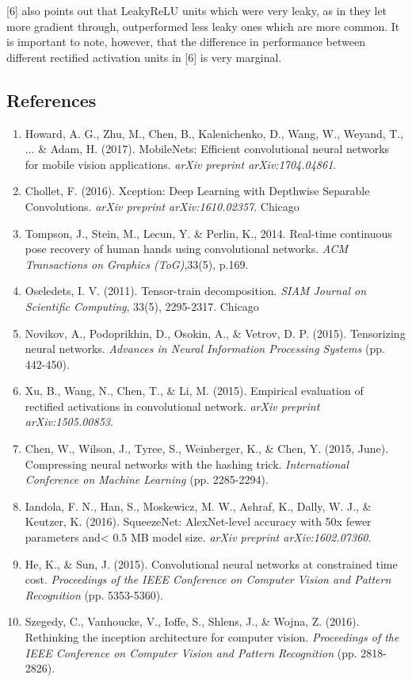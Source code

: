 \documentclass{article}
\begin{document}
[6] also points out that LeakyReLU units which were very leaky, as in they let more gradient through, outperformed less leaky ones which are more common. It is important to note, however, that the difference in performance between different rectified activation units in [6] is very marginal.

\subsection*{References}
\begin{enumerate}
\item Howard, A. G., Zhu, M., Chen, B., Kalenichenko, D., Wang, W., Weyand, T., ... \& Adam, H. (2017). MobileNets: Efficient convolutional neural networks for mobile vision applications. \emph{arXiv preprint arXiv:1704.04861}.
\item Chollet, F. (2016). Xception: Deep Learning with Depthwise Separable Convolutions. \emph{arXiv preprint arXiv:1610.02357}.
Chicago	
\item Tompson, J., Stein, M., Lecun, Y. \& Perlin, K., 2014. Real-time continuous pose recovery of human hands using convolutional networks. \emph{ACM Transactions on Graphics (ToG)},33(5), p.169.
\item Oseledets, I. V. (2011). Tensor-train decomposition. \emph{SIAM Journal on Scientific Computing}, 33(5), 2295-2317.
Chicago	
\item Novikov, A., Podoprikhin, D., Osokin, A., \& Vetrov, D. P. (2015). Tensorizing neural networks. \emph{Advances in Neural Information Processing Systems} (pp. 442-450).
\item Xu, B., Wang, N., Chen, T., \& Li, M. (2015). Empirical evaluation of rectified activations in convolutional network. \emph{arXiv preprint arXiv:1505.00853}.
\item Chen, W., Wilson, J., Tyree, S., Weinberger, K., \& Chen, Y. (2015, June). Compressing neural networks with the hashing trick. \emph{International Conference on Machine Learning} (pp. 2285-2294).
\item Iandola, F. N., Han, S., Moskewicz, M. W., Ashraf, K., Dally, W. J., \& Keutzer, K. (2016). SqueezeNet: AlexNet-level accuracy with 50x fewer parameters and< 0.5 MB model size. \emph{arXiv preprint arXiv:1602.07360}.
\item He, K., \& Sun, J. (2015). Convolutional neural networks at constrained time cost. \emph{Proceedings of the IEEE Conference on Computer Vision and Pattern Recognition} (pp. 5353-5360).
\item Szegedy, C., Vanhoucke, V., Ioffe, S., Shlens, J., \& Wojna, Z. (2016). Rethinking the inception architecture for computer vision. \emph{Proceedings of the IEEE Conference on Computer Vision and Pattern Recognition} (pp. 2818-2826).

\end{enumerate}
\end{document}
